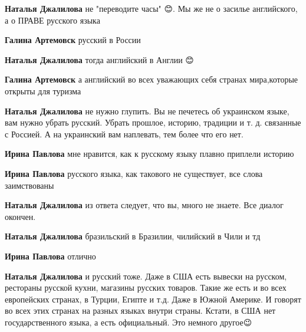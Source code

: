 \begin{itemize}
\begin{itemize}
\textbf{Наталья Джалилова} не "переводите часы" 😊. Мы же не о засилье английского, а о ПРАВЕ русского языка

\textbf{Галина Артемовск} русский в России

\textbf{Наталья Джалилова} тогда английский в Англии 😊

\textbf{Галина Артемовск} а английский во всех уважающих себя странах мира,которые открыты для туризма

\textbf{Наталья Джалилова} не нужно глупить. Вы не печетесь об украинском
языке, вам нужно убрать русский. Убрать прошлое, историю, традиции и т. д.
связанные с Россией. А на украинский вам наплевать, тем более что его нет.

\textbf{Ирина Павлова} мне нравится, как к русскому языку плавно приплели историю

\textbf{Ирина Павлова} русского языка, как такового не существует, все слова заимствованы

\textbf{Наталья Джалилова} из ответа следует, что вы, много не знаете. Все диалог окончен.

\textbf{Наталья Джалилова} бразильский в Бразилии, чилийский в Чили и тд

\textbf{Ирина Павлова} отлично

\textbf{Наталья Джалилова} и русский тоже. Даже в США есть вывески на русском,
рестораны русской кухни, магазины русских товаров. Такие же есть и во всех
европейских странах, в Турции, Египте и т.д. Даже в Южной Америке. И говорят во
всех этих странах на разных языках внутри страны. Кстати, в США нет
государственного языка, а есть официальный. Это немного другое😉



\end{itemize}
\end{itemize}
